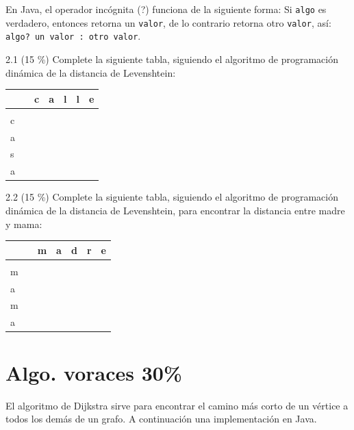 \documentclass[twocolumn]{article}
\begin{document}
En Java, el operador incógnita (?) funciona de la siguiente forma: Si \texttt{algo} es verdadero, entonces retorna un \texttt{valor},
de lo contrario retorna otro \texttt{valor}, así:
\texttt{algo? un valor : otro valor}.

2.1 (15 \%) Complete la siguiente tabla, siguiendo el algoritmo de programación dinámica de la distancia de Levenshtein:

\begin{tabular}{| l  | l  | l  | l  | l  | l  | l |}
\hline
  & & c & a & l & l & e \\
 \hline
  & &  &  &  &  &  \\
  \hline
c & &  &  &  &  &  \\
\hline
a & &  &  &  &  &  \\
\hline
s & &  &  &  &  &  \\
\hline
a & &  &  &  &  &  \\
\hline
\end{tabular}


2.2 (15 \%) Complete la siguiente tabla, siguiendo el algoritmo de programación dinámica de la distancia de Levenshtein, para encontrar
la distancia entre madre y mama:

\begin{tabular}{| l  | l  | l  | l  | l  | l  | l |}
\hline
  & & m & a & d & r & e \\
 \hline
  & &  &  &  &  &  \\
  \hline
m & &  &  &  &  &  \\
\hline
a & &  &  &  &  &  \\
\hline
m & &  &  &  &  &  \\
\hline
a & &  &  &  &  &  \\
\hline
\end{tabular}


\section{Algo. voraces 30\%}
El algoritmo de Dijkstra sirve para encontrar el camino más corto
de un vértice a todos los demás de un grafo. A continuación una
implementación en Java.
\end{document}
